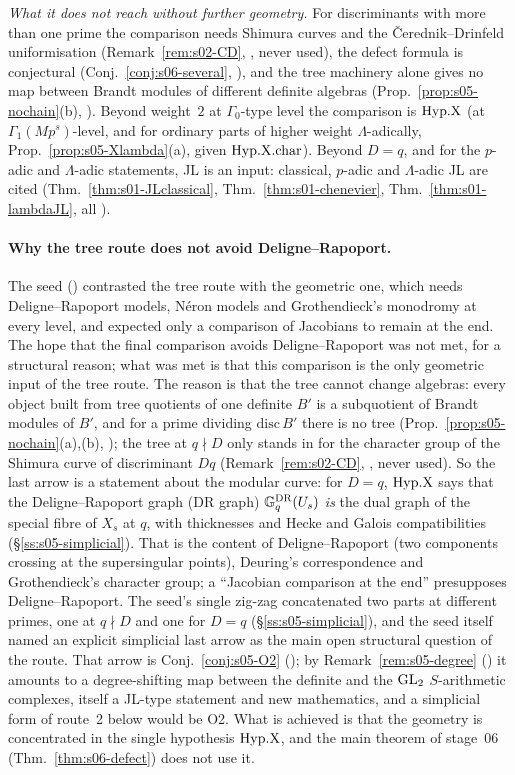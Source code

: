 \emph{What it does not reach without further geometry.} For discriminants with more than one prime the comparison needs Shimura
curves and the \v{C}erednik--Drinfeld uniformisation (Remark~\ref{rem:s02-CD}, \stcited, never used), the defect formula is
conjectural (Conj.~\ref{conj:s06-several}, \stconj), and the tree machinery alone gives no map between Brandt modules of different
definite algebras (Prop.~\ref{prop:s05-nochain}(b), \stproved). Beyond weight~$2$ at $\Gamma_0$-type level the comparison is
$\mathrm{Hyp.X}$ (at $\Gamma_1(Mp^s)$-level, and for ordinary parts of higher weight $\Lambda$-adically, Prop.~\ref{prop:s05-Xlambda}(a),
\stproved{} given $\mathrm{Hyp.X.char}$). Beyond $D=q$, and for the $p$-adic and $\Lambda$-adic statements, JL is an input: classical, $p$-adic and $\Lambda$-adic JL are cited (Thm.~\ref{thm:s01-JLclassical},
Thm.~\ref{thm:s01-chenevier}, Thm.~\ref{thm:s01-lambdaJL}, all \stcited).

\paragraph{Why the tree route does not avoid Deligne--Rapoport.} The seed () contrasted
the tree route with the geometric one, which needs Deligne--Rapoport models, N\'eron models and Grothendieck's monodromy at every
level, and expected only a comparison of Jacobians to remain at the end. The hope that the final comparison avoids Deligne--Rapoport was not
met, for a structural reason; what was met is that this comparison is the only geometric input of the tree route. The reason is that the tree cannot change
algebras: every object built from tree quotients of one definite $B'$ is a subquotient of Brandt modules of $B'$, and
for a prime dividing $\mathrm{disc}\,B'$ there is no tree (Prop.~\ref{prop:s05-nochain}(a),(b), \stproved); the tree at $q\nmid D$
only stands in for the character group of the Shimura curve of discriminant $Dq$ (Remark~\ref{rem:s02-CD}, \stcited, never used).
So the last arrow is a statement about the modular curve: for $D=q$, $\mathrm{Hyp.X}$ says that the Deligne--Rapoport graph (DR graph) $\mathbb{G}^{\mathrm{DR}}_q(U_s)$ \emph{is} the
dual graph of the special fibre of $X_s$ at $q$, with thicknesses and Hecke and Galois compatibilities (\S\ref{ss:s05-simplicial}).
That is the content of Deligne--Rapoport (two components crossing at the supersingular points), Deuring's correspondence and
Grothendieck's character group; a ``Jacobian comparison at the end'' presupposes Deligne--Rapoport. The seed's single zig-zag
concatenated two parts at different primes, one at $q\nmid D$ and one for $D=q$ (\S\ref{ss:s05-simplicial}), and the seed itself
named an explicit simplicial last arrow as the main open structural question of the route. That arrow is Conj.~\ref{conj:s05-O2}
(\stconj); by Remark~\ref{rem:s05-degree} (\stsketch) it amounts to a degree-shifting map between the definite and the $\mathrm{GL}_2$
$S$-arithmetic complexes, itself a JL-type statement and new mathematics, and a simplicial form of route~2 below would be O2.
What is achieved is that the geometry is concentrated in the single hypothesis $\mathrm{Hyp.X}$, and the main theorem of stage~06
(Thm.~\ref{thm:s06-defect}) does not use it.

